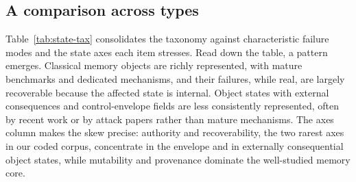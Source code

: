\subsection{A comparison across types}

Table~\ref{tab:state-tax} consolidates the taxonomy against characteristic failure modes and the state axes each item stresses. Read down the table, a pattern emerges. Classical memory objects are richly represented, with mature benchmarks and dedicated mechanisms, and their failures, while real, are largely recoverable because the affected state is internal. Object states with external consequences and control-envelope fields are less consistently represented, often by recent work or by attack papers rather than mature mechanisms. The axes column makes the skew precise: authority and recoverability, the two rarest axes in our coded corpus, concentrate in the envelope and in externally consequential object states, while mutability and provenance dominate the well-studied memory core.

